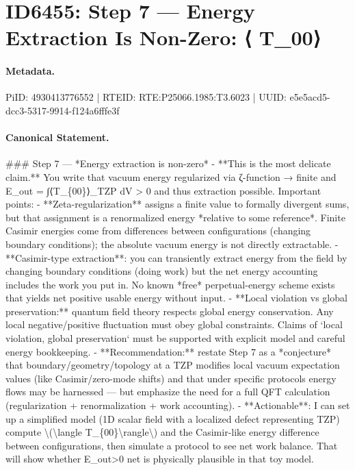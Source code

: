 \section*{ID6455: Step 7 — Energy Extraction Is Non-Zero: ⟨ T\_00⟩}
\paragraph{Metadata.}
PiID: 4930413776552 | RTEID: RTE:P25066.1985:T3.6023 | UUID: e5e5acd5-dcc3-5317-9914-f124a6fffe3f

\paragraph{Canonical Statement.}
\#\#\# Step 7 — *Energy extraction is non-zero* - **This is the most delicate claim.** You write that vacuum energy regularized via ζ-function → finite and E\_out = ∫⟨T\_\{00\}⟩\_TZP dV > 0 and thus extraction possible. Important points: - **Zeta-regularization** assigns a finite value to formally divergent sums, but that assignment is a renormalized energy *relative to some reference*. Finite Casimir energies come from differences between configurations (changing boundary conditions); the absolute vacuum energy is not directly extractable. - **Casimir-type extraction**: you can transiently extract energy from the field by changing boundary conditions (doing work) but the net energy accounting includes the work you put in. No known *free* perpetual-energy scheme exists that yields net positive usable energy without input. - **Local violation vs global preservation:** quantum field theory respects global energy conservation. Any local negative/positive fluctuation must obey global constraints. Claims of `local violation, global preservation` must be supported with explicit model and careful energy bookkeeping. - **Recommendation:** restate Step 7 as a *conjecture* that boundary/geometry/topology at a TZP modifies local vacuum expectation values (like Casimir/zero-mode shifts) and that under specific protocols energy flows may be harnessed — but emphasize the need for a full QFT calculation (regularization + renormalization + work accounting). - **Actionable**: I can set up a simplified model (1D scalar field with a localized defect representing TZP) compute \textbackslash{}(\textbackslash{}langle T\_\{00\}\textbackslash{}rangle\textbackslash{}) and the Casimir-like energy difference between configurations, then simulate a protocol to see net work balance. That will show whether E\_out>0 net is physically plausible in that toy model.

